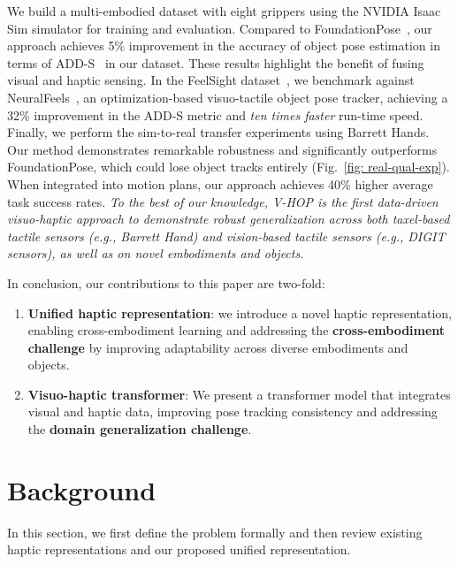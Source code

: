 \documentclass[11pt, a4paper, logo, twocolumn]{brown}
\newcommand{\shortname}{V-HOP\xspace}
\begin{document}
We build a multi-embodied dataset with eight grippers using the NVIDIA Isaac Sim simulator for training and evaluation.
Compared to FoundationPose~\cite{wen_foundationpose_2024}, our approach achieves 5\% improvement in the accuracy of object pose estimation in terms of ADD-S~\cite{xiang_posecnn_2018} in our dataset. 
These results highlight the benefit of fusing visual and haptic sensing.
In the FeelSight dataset~\cite{suresh_neuralfeels_2024}, we benchmark against NeuralFeels~\cite{suresh_neuralfeels_2024}, an optimization-based visuo-tactile object pose tracker, achieving a 32\% improvement in the ADD-S metric and \emph{ten times faster} run-time speed.
Finally, we perform the sim-to-real transfer experiments using Barrett Hands. 
Our method demonstrates remarkable robustness and significantly outperforms FoundationPose, which could lose object tracks entirely (Fig.~\ref{fig: real-qual-exp}). 
When integrated into motion plans, our approach achieves 40\% higher average task success rates. 
\emph{To the best of our knowledge, \shortname is the first data-driven visuo-haptic approach to demonstrate robust generalization across both taxel-based tactile sensors (e.g., Barrett Hand) and vision-based tactile sensors (e.g., DIGIT sensors), as well as on novel embodiments and objects.}

In conclusion, our contributions to this paper are two-fold:
\begin{enumerate}
    \item \textbf{Unified haptic representation}: we introduce a novel haptic representation, enabling cross-embodiment learning and addressing the \textbf{cross-embodiment challenge} by improving adaptability across diverse embodiments and objects.
    \item \textbf{Visuo-haptic transformer}: We present a transformer model that integrates visual and haptic data, improving pose tracking consistency and addressing the \textbf{domain generalization challenge}.
\end{enumerate}


\section{Background}
In this section, we first define the problem formally and then review existing haptic representations and our proposed unified representation.
\end{document}
